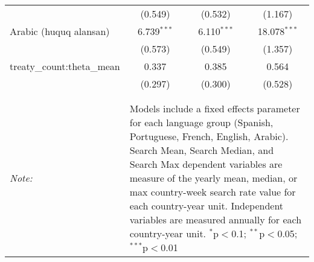 \begin{table}[!htbp]
\begin{tabular}{@{\extracolsep{5pt}}lccc}
  & (0.549) & (0.532) & (1.167) \\ 
  Arabic (huquq alansan) & 6.739$^{***}$ & 6.110$^{***}$ & 18.078$^{***}$ \\ 
  & (0.573) & (0.549) & (1.357) \\ 
  treaty\_count:theta\_mean & 0.337 & 0.385 & 0.564 \\ 
  & (0.297) & (0.300) & (0.528) \\ 
 \hline \\[-1.8ex] 
\hline 
\hline \\[-1.8ex] 
\textit{Note:}  & \multicolumn{3}{l}{\parbox[t]{8cm}{Models include a fixed effects parameter for each language group (Spanish, Portuguese, French, English, Arabic). Search Mean, Search Median, and Search Max dependent variables are measure of the yearly mean, median, or max country-week search rate value for each country-year unit. Independent variables are measured annually for each country-year unit. $^{*}$p$<$0.1; $^{**}$p$<$0.05; $^{***}$p$<$0.01}} \\ 
\end{tabular} 
\end{table} 
